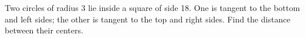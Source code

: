 Two circles of radius 3 lie inside a square of side 18. One is tangent to the bottom and left sides; the other is tangent to the top and right sides. Find the distance between their centers.
